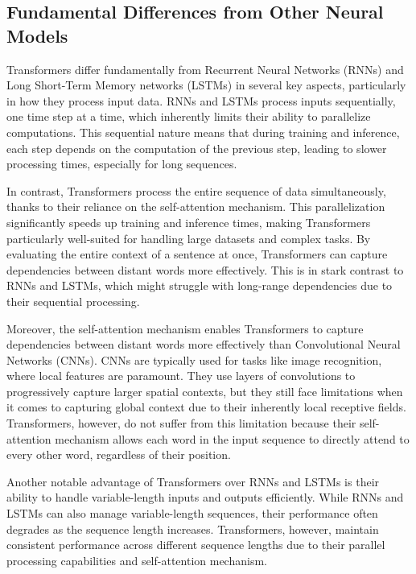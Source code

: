\subsection{Fundamental Differences from Other Neural Models}

Transformers differ fundamentally from Recurrent Neural Networks (RNNs) and Long Short-Term Memory networks (LSTMs) in several key aspects, particularly in how they process input data. RNNs and LSTMs process inputs sequentially, one time step at a time, which inherently limits their ability to parallelize computations. This sequential nature means that during training and inference, each step depends on the computation of the previous step, leading to slower processing times, especially for long sequences.

In contrast, Transformers process the entire sequence of data simultaneously, thanks to their reliance on the self-attention mechanism. This parallelization significantly speeds up training and inference times, making Transformers particularly well-suited for handling large datasets and complex tasks. By evaluating the entire context of a sentence at once, Transformers can capture dependencies between distant words more effectively. This is in stark contrast to RNNs and LSTMs, which might struggle with long-range dependencies due to their sequential processing.

Moreover, the self-attention mechanism enables Transformers to capture dependencies between distant words more effectively than Convolutional Neural Networks (CNNs). CNNs are typically used for tasks like image recognition, where local features are paramount. They use layers of convolutions to progressively capture larger spatial contexts, but they still face limitations when it comes to capturing global context due to their inherently local receptive fields. Transformers, however, do not suffer from this limitation because their self-attention mechanism allows each word in the input sequence to directly attend to every other word, regardless of their position.

Another notable advantage of Transformers over RNNs and LSTMs is their ability to handle variable-length inputs and outputs efficiently. While RNNs and LSTMs can also manage variable-length sequences, their performance often degrades as the sequence length increases. Transformers, however, maintain consistent performance across different sequence lengths due to their parallel processing capabilities and self-attention mechanism.

